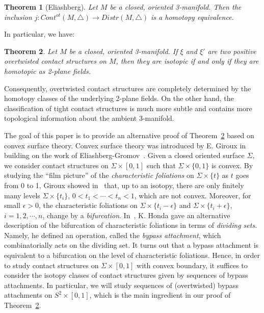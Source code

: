\documentclass[12pt]{amsart}
\newtheorem{thm}{Theorem}[section]
\theoremstyle{remark}
\begin{document}
\begin{thm}[Eliashberg]
Let $M$ be a closed, oriented 3-manifold. Then the inclusion $j:Cont^{ot}(M,\triangle) \to Distr(M,\triangle)$ is a homotopy equivalence.
\end{thm}

In particular, we have:

\begin{thm} \label{OT}
Let $M$ be a closed, oriented 3-manifold. If $\xi$ and $\xi'$ are two positive overtwisted contact structures on $M$, then they are isotopic if and only if they are homotopic as 2-plane fields.
\end{thm}

Consequently, overtwisted contact structures are completely determined by the homotopy classes of the underlying 2-plane fields. On the other hand, the classification of tight contact structures is much more subtle and contains more topological information about the ambient 3-manifold.

The goal of this paper is to provide an alternative proof of Theorem~\ref{OT} based on convex surface theory. Convex surface theory was introduced by E. Giroux in~\cite{Gi} building on the work of Eliashberg-Gromov~\cite{ElGr}. Given a closed oriented surface $\Sigma$, we consider contact structures on $\Sigma\times[0,1]$ such that $\Sigma\times\{0,1\}$ is convex. By studying the ``film picture'' of the {\em characteristic foliations} on $\Sigma\times\{t\}$ as $t$ goes from 0 to 1, Giroux showed in~\cite{Gi1} that, up to an isotopy, there are only finitely many levels $\Sigma\times\{t_i\}$, $0<t_1<\cdots<t_n<1$, which are not convex. Moreover, for small $\epsilon>0$, the characteristic foliations on $\Sigma\times\{t_i-\epsilon\}$ and $\Sigma\times\{t_i+\epsilon\}$, $i=1,2,\cdots,n$, change by a {\em bifurcation}. In~\cite{Ho}, K. Honda gave an alternative description of the bifurcation of characteristic foliations in terms of {\em dividing sets}. Namely, he defined an operation, called the {\em bypass attachment}, which combinatorially acts on the dividing set. It turns out that a bypass attachment is equivalent to a bifurcation on the level of characteristic foliations. Hence, in order to study contact structures on $\Sigma \times [0,1]$ with convex boundary, it suffices to consider the isotopy classes of contact structures given by sequences of bypass attachments. In particular, we will study sequences of (overtwisted) bypass attachments on $S^2 \times [0,1]$, which is the main ingredient in our proof of Theorem~\ref{OT}.
\end{document}
